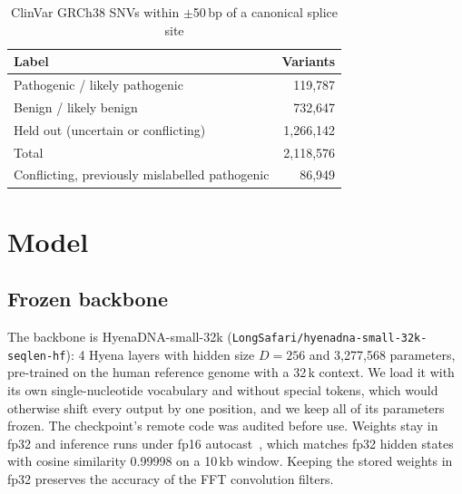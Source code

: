 \documentclass[conference]{IEEEtran}
\begin{document}
\begin{table}[t]
\centering
\caption{ClinVar GRCh38 SNVs within $\pm$50\,bp of a canonical splice site}
\label{tab:clinvar}
\begin{tabular}{lr}
\toprule
Label & Variants \\
\midrule
Pathogenic / likely pathogenic & 119{,}787 \\
Benign / likely benign & 732{,}647 \\
Held out (uncertain or conflicting) & 1{,}266{,}142 \\
\midrule
Total & 2{,}118{,}576 \\
\midrule
Conflicting, previously mislabelled pathogenic & 86{,}949 \\
\bottomrule
\end{tabular}
\end{table}

\section{Model}\label{sec:model}
\subsection{Frozen backbone}
The backbone is HyenaDNA-small-32k (\texttt{LongSafari/hyenadna-small-32k-seqlen-hf}): 4 Hyena layers with hidden size $D=256$ and 3{,}277{,}568 parameters, pre-trained on the human reference genome with a 32\,k context. We load it with its own single-nucleotide vocabulary and without special tokens, which would otherwise shift every output by one position, and we keep all of its parameters frozen. The checkpoint's remote code was audited before use. Weights stay in fp32 and inference runs under fp16 autocast~\cite{micikevicius2018mixed}, which matches fp32 hidden states with cosine similarity 0.99998 on a 10\,kb window. Keeping the stored weights in fp32 preserves the accuracy of the FFT convolution filters.
\end{document}
